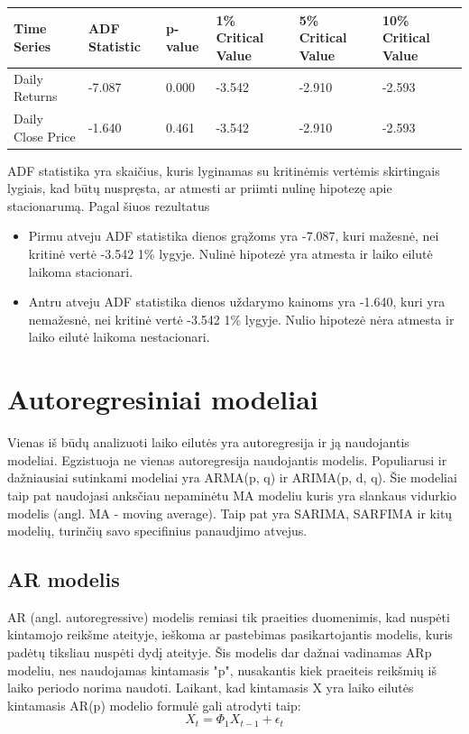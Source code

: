 \documentclass{VUMIFInfKursinis}
\begin{document}
\begin{tabularx}{\linewidth}{|X|X|X|X|X|X|}
  \hline
  \textbf{Time Series} & \textbf{ADF Statistic} & \textbf{p-value} & \textbf{1\% Critical Value} & \textbf{5\% Critical Value} & \textbf{10\% Critical Value} \\ \hline
  Daily Returns        & -7.087                 & 0.000            & -3.542                      & -2.910                      & -2.593                       \\ \hline
  Daily Close Price    & -1.640                 & 0.461            & -3.542                      & -2.910                      & -2.593                       \\ \hline
\end{tabularx}

\vspace{10pt}
ADF statistika yra skaičius, kuris lyginamas su kritinėmis vertėmis skirtingais lygiais, kad būtų nuspręsta, ar atmesti ar priimti nulinę hipotezę apie stacionarumą. Pagal šiuos rezultatus
\begin{itemize}
  \item Pirmu atveju ADF statistika dienos grąžoms yra -7.087, kuri mažesnė, nei kritinė vertė -3.542 1\% lygyje. Nulinė hipotezė yra atmesta ir laiko eilutė laikoma stacionari.
  \item Antru atveju ADF statistika dienos uždarymo kainoms yra -1.640, kuri yra nemažesnė, nei kritinė vertė -3.542 1\% lygyje. Nulio hipotezė nėra atmesta ir laiko eilutė laikoma nestacionari.
\end{itemize}

\section{Autoregresiniai modeliai}
Vienas iš būdų analizuoti laiko eilutės yra autoregresija ir ją naudojantis modeliai. Egzistuoja ne vienas autoregresija naudojantis modelis. 
Populiarusi ir dažniausiai sutinkami modeliai yra ARMA(p, q) ir ARIMA(p, d, q).
Šie modeliai taip pat naudojasi anksčiau nepaminėtu MA modeliu kuris yra slankaus vidurkio modelis (angl. MA - moving average).
Taip pat yra SARIMA, SARFIMA ir kitų modelių, turinčių savo specifinius panaudjimo atvejus. 

\subsection{AR modelis}
AR (angl. autoregressive) modelis remiasi tik praeities duomenimis, kad nuspėti kintamojo reikšme ateityje, ieškoma ar pastebimas pasikartojantis
modelis, kuris padėtų tiksliau nuspėti dydį ateityje\cite{chi2018stock}. Šis modelis dar dažnai vadinamas ARp modeliu, nes naudojamas kintamasis "p", nusakantis kiek praeiteis reikšmių 
iš laiko periodo norima naudoti. Laikant, kad kintamasis X yra laiko eilutės kintamasis AR(p) modelio formulė gali atrodyti taip: 
\[X_{t} = \Phi _{1}X_{t-1}+\epsilon_{t} \]
\end{document}
